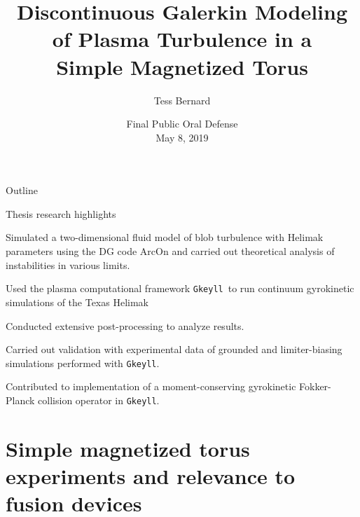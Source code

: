 \documentclass[12pt,table]{beamer}
\newcommand{\gke}{{\tt Gkeyll}}
\begin{document}
\title[DG Modeling of SMT Plasma Turbulence]{\LARGE Discontinuous Galerkin Modeling of Plasma Turbulence in a \\ Simple Magnetized Torus}%
\author[T. Bernard]{\large Tess Bernard}%
\date{Final Public Oral Defense \\ May 8, 2019}

\addtocounter{framenumber}{-1}
\begin{frame}[plain]
  \titlepage
\end{frame}

\begin{frame}{Outline}
    \tableofcontents
\end{frame}

\begin{frame}{Thesis research highlights}
\begin{itemize}
    \item Simulated a two-dimensional fluid model of blob turbulence with Helimak parameters using the DG code ArcOn and carried out theoretical analysis of instabilities in various limits.
    {\bf \item Used the plasma computational framework \gke\ to run continuum gyrokinetic simulations of the Texas Helimak
    \item Conducted extensive post-processing to analyze results.
    \item Carried out validation with experimental data of grounded and limiter-biasing simulations performed with \gke.}
    \item Contributed to implementation of a moment-conserving gyrokinetic Fokker-Planck collision operator in \gke.
\end{itemize}    
\end{frame}

\section[Background]{{\bf Simple magnetized torus experiments} and relevance to fusion devices}
\end{document}
